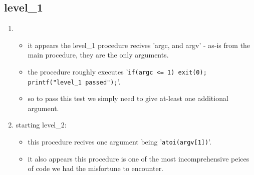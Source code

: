 \documentclass{article}
\begin{document}
\subsection{level\_1}
\begin{enumerate}
    \item
	\begin{itemize}
		\item it appears the level\_1 procedure recives 'argc, and argv' - as-is from the main procedure, they are the only arguments.
		\item the procedure roughly executes '\texttt{if(argc <= 1) exit(0); printf("level\_1 passed");}'.
		\item so to pass this test we simply need to give at-least one additional argument.
	\end{itemize}
    \item starting level\_2:
    \begin{itemize}
		\item this procedure recives one argument being '\texttt{atoi(argv[1])}'.
		\item it also appears this procedure is one of the most incomprehensive peices of code we had the misfortune to encounter.
    \end{itemize}
\end{enumerate}
\end{document}
